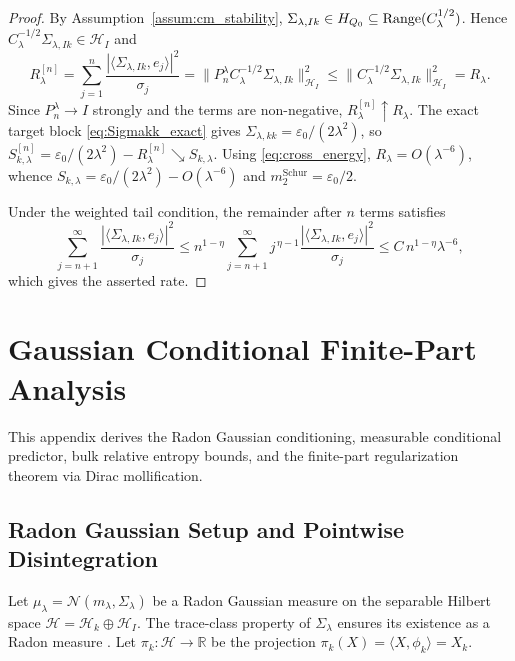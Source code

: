 \begin{proof}
By Assumption~\ref{assum:cm_stability}, $\Sigma_{\lambda,Ik}\in H_{Q_0}\subseteq\operatorname{Range}(C_\lambda^{1/2})$.  Hence $C_\lambda^{-1/2}\Sigma_{\lambda,Ik}\in\mathcal{H}_I$ and
\begin{equation}
  R_\lambda^{[n]}=\sum_{j=1}^{n}\frac{|\langle\Sigma_{\lambda,Ik},e_j\rangle|^2}{\sigma_j}
  =\|P_n^\lambda C_\lambda^{-1/2}\Sigma_{\lambda,Ik}\|_{\mathcal{H}_I}^2
  \le\|C_\lambda^{-1/2}\Sigma_{\lambda,Ik}\|_{\mathcal{H}_I}^2=R_\lambda.
\end{equation}
Since $P_n^\lambda\to I$ strongly and the terms are non-negative, $R_\lambda^{[n]}\uparrow R_\lambda$.  The exact target block \eqref{eq:Sigmakk_exact} gives $\Sigma_{\lambda,kk}=\varepsilon_0/(2\lambda^2)$, so $S_{k,\lambda}^{[n]}=\varepsilon_0/(2\lambda^2)-R_\lambda^{[n]}\searrow S_{k,\lambda}$.  Using \eqref{eq:cross_energy}, $R_\lambda=O(\lambda^{-6})$, whence $S_{k,\lambda}=\varepsilon_0/(2\lambda^2)-O(\lambda^{-6})$ and $m_2^{\mathrm{Schur}}=\varepsilon_0/2$.

Under the weighted tail condition, the remainder after $n$ terms satisfies
\begin{equation}
  \sum_{j=n+1}^{\infty}\frac{|\langle\Sigma_{\lambda,Ik},e_j\rangle|^2}{\sigma_j}
  \le n^{1-\eta}\sum_{j=n+1}^{\infty}j^{\,\eta-1}\frac{|\langle\Sigma_{\lambda,Ik},e_j\rangle|^2}{\sigma_j}
  \le C\,n^{1-\eta}\lambda^{-6},
\end{equation}
which gives the asserted rate.
\end{proof}



\section{Gaussian Conditional Finite-Part Analysis}
\label{app:gaussian_lift}

This appendix derives the Radon Gaussian conditioning, measurable conditional predictor, bulk relative entropy bounds, and the finite-part regularization theorem via Dirac mollification.

\subsection{Radon Gaussian Setup and Pointwise Disintegration}

Let $\mu_\lambda = \mathcal{N}(m_\lambda, \Sigma_\lambda)$ be a Radon Gaussian measure on the separable Hilbert space $\mathcal{H} = \mathcal{H}_k \oplus \mathcal{H}_I$. The trace-class property of $\Sigma_\lambda$ ensures its existence as a Radon measure \cite{bogachev1998gaussian}. Let $\pi_k: \mathcal{H} \to \mathbb{R}$ be the projection $\pi_k(X) = \langle X, \phi_k \rangle = X_k$.

